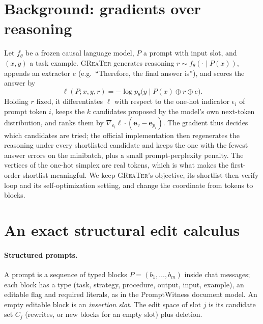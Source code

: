 \documentclass{article}
\newcommand{\greater}{\textsc{GReaTer}}
\begin{document}
\section{Background: gradients over reasoning}
\label{sec:background}

Let $f_\theta$ be a frozen causal language model, $P$ a prompt with input slot, and
$(x,y)$ a task example. \greater{} generates reasoning $r\sim f_\theta(\cdot\mid P(x))$,
appends an extractor $e$ (e.g.\ ``Therefore, the final answer is''), and scores the
answer by
\begin{equation}
\ell(P;x,y,r) = -\log p_\theta\big(y \mid P(x)\oplus r\oplus e\big).
\label{eq:loss}
\end{equation}
Holding $r$ fixed, it differentiates $\ell$ with respect to the one-hot indicator
$\epsilon_i$ of prompt token $i$, keeps the $k$ candidates proposed by the model's
own next-token distribution, and ranks them by $\nabla_{\epsilon_i}\ell\cdot(\mathbf e_v-\mathbf e_{p_i})$.
The gradient thus decides which candidates are tried; the official implementation
then regenerates the reasoning under every shortlisted candidate and keeps the one
with the fewest answer errors on the minibatch, plus a small prompt-perplexity
penalty. The vertices of the one-hot simplex are real tokens, which is what makes
the first-order shortlist meaningful. We keep \greater{}'s objective, its
shortlist-then-verify loop and its self-optimization setting, and change the
coordinate from tokens to blocks.

\section{An exact structural edit calculus}
\label{sec:calculus}

\paragraph{Structured prompts.} A prompt is a sequence of typed blocks
$P=(b_1,\dots,b_m)$ inside chat messages; each block has a type (task, strategy,
procedure, output, input, example), an editable flag and required literals, as in
the PromptWitness document model. An empty editable block is an \emph{insertion
slot}. The edit space of slot $j$ is its candidate set $C_j$ (rewrites, or new
blocks for an empty slot) plus deletion.
\end{document}

